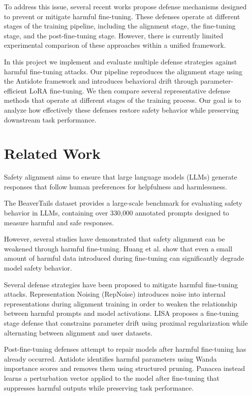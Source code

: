 \documentclass[11pt]{article}
\begin{document}
To address this issue, several recent works propose defense mechanisms designed to prevent or mitigate harmful fine-tuning. These defenses operate at different stages of the training pipeline, including the alignment stage, the fine-tuning stage, and the post-fine-tuning stage. However, there is currently limited experimental comparison of these approaches within a unified framework.

In this project we implement and evaluate multiple defense strategies against harmful fine-tuning attacks. Our pipeline reproduces the alignment stage using the Antidote framework and introduces behavioral drift through parameter-efficient LoRA fine-tuning. We then compare several representative defense methods that operate at different stages of the training process. Our goal is to analyze how effectively these defenses restore safety behavior while preserving downstream task performance.

\section{Related Work}

Safety alignment aims to ensure that large language models (LLMs) generate responses that follow human preferences for helpfulness and harmlessness. 

The BeaverTails dataset \citep{ji2023beavertails} provides a large-scale benchmark for evaluating safety behavior in LLMs, containing over 330,000 annotated prompts designed to measure harmful and safe responses.


However, several studies have demonstrated that safety alignment can be weakened through harmful fine-tuning. 
Huang et al. \citep{huang2024antidote} show that even a small amount of harmful data introduced during fine-tuning can significantly degrade model safety behavior.

Several defense strategies have been proposed to mitigate harmful fine-tuning attacks. 
Representation Noising (RepNoise) \citep{rosati2024repnoise} introduces noise into internal representations during alignment training in order to weaken the relationship between harmful prompts and model activations. 
LISA \citep{huang2024lisa} proposes a fine-tuning stage defense that constrains parameter drift using proximal regularization while alternating between alignment and user datasets.

Post-fine-tuning defenses attempt to repair models after harmful fine-tuning has already occurred. 
Antidote \citep{huang2024antidote} identifies harmful parameters using Wanda importance scores and removes them using structured pruning. 
Panacea \citep{wang2025panacea} instead learns a perturbation vector applied to the model after fine-tuning that suppresses harmful outputs while preserving task performance.
\end{document}
